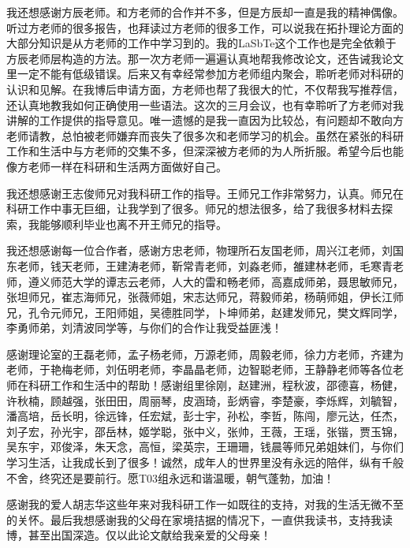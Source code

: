 我还想感谢方辰老师。和方老师的合作并不多，但是方辰却一直是我的精神偶像。听过方老师的很多报告，也拜读过方老师的很多工作，可以说我在拓扑理论方面的大部分知识是从方老师的工作中学习到的。我的LaSbTe这个工作也是完全依赖于方辰老师层构造的方法。那一次方老师一遍遍认真地帮我修改论文，还告诫我论文里一定不能有低级错误。后来又有幸经常参加方老师组内聚会，聆听老师对科研的认识和见解。在我博后申请方面，方老师也帮了我很大的忙，不仅帮我写推荐信，还认真地教我如何正确使用一些语法。这次的三月会议，也有幸聆听了方老师对我讲解的工作提供的指导意见。唯一遗憾的是我一直因为比较怂，有问题却不敢向方老师请教，总怕被老师嫌弃而丧失了很多次和老师学习的机会。虽然在紧张的科研工作和生活中与方老师的交集不多，但深深被方老师的为人所折服。希望今后也能像方老师一样在科研和生活两方面做好自己。

我还想感谢王志俊师兄对我科研工作的指导。王师兄工作非常努力，认真。师兄在科研工作中事无巨细，让我学到了很多。师兄的想法很多，给了我很多材料去探索，我能够顺利毕业也离不开王师兄的指导。

我还想感谢每一位合作者，感谢方忠老师，物理所石友国老师，周兴江老师，刘国东老师，钱天老师，王建涛老师，靳常青老师，刘淼老师，雒建林老师，毛寒青老师，遵义师范大学的谭志云老师，人大的雷和畅老师，高嘉成师弟，聂思敏师兄，张坦师兄，崔志海师兄，张薇师姐，宋志达师兄，蒋毅师弟，杨萌师姐，伊长江师兄，孔令元师兄，王阳师姐，吴德胜同学，卜坤师弟，赵建发师兄，樊文辉同学，李勇师弟，刘清波同学等，与你们的合作让我受益匪浅！

感谢理论室的王磊老师，孟子杨老师，万源老师，周毅老师，徐力方老师，齐建为老师，于艳梅老师，刘伍明老师，李晶晶老师，边智聪老师，王静静老师等各位老师在科研工作和生活中的帮助！感谢组里徐刚，赵建洲，程秋波，邵德喜，杨健，
许秋楠，顾越强，张田田，周丽琴，皮涵琦，彭炳睿，李楚豪，李烁辉，刘毓智，潘高培，岳长明，徐远锋，任宏斌，彭士宇，孙松，李哲，陈闯，廖元达，任杰，刘子宏，孙光宇，邵岳林，姬学聪，张中义，张帅，王薇，王瑶，张锴，贾玉锦，吴东宇，邓俊泽，朱天念，高恒，梁英宗，王珊珊，钱晨等师兄弟姐妹们，与你们学习生活，让我成长到了很多！诚然，成年人的世界里没有永远的陪伴，纵有千般不舍，终究还是要前行。愿T03组永远和谐温暖，朝气蓬勃，加油！

感谢我的爱人胡志华这些年来对我科研工作一如既往的支持，对我的生活无微不至的关怀。最后我想感谢我的父母在家境拮据的情况下，一直供我读书，支持我读博，甚至出国深造。仅以此论文献给我亲爱的父母亲！

\cleardoublepage[plain]%



